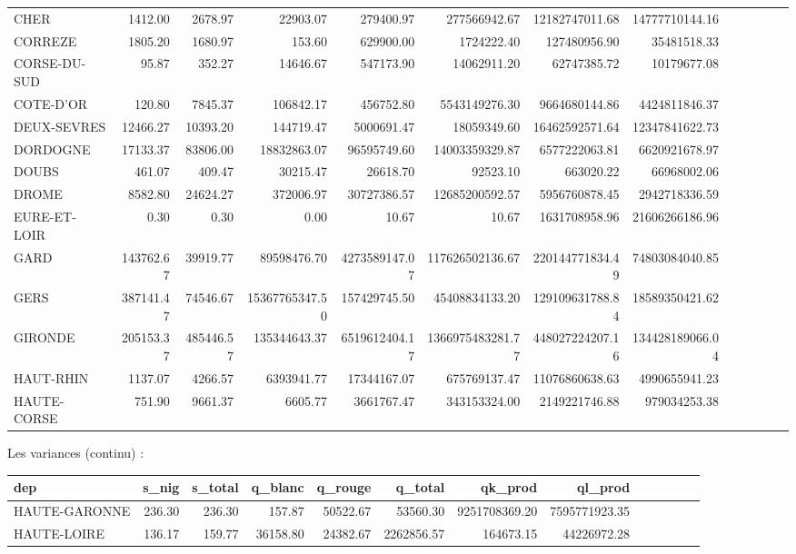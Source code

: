 \documentclass[11pt, a4paper]{article}
\begin{document}
\begin{landscape}
\begin{tabular}{lrrrrrrrrrrrr}
    CHER & 1412.00 & 2678.97 & 22903.07 & 279400.97 & 277566942.67 & 12182747011.68 & 14777710144.16 \\ 
    CORREZE & 1805.20 & 1680.97 & 153.60 & 629900.00 & 1724222.40 & 127480956.90 & 35481518.33 \\ 
    CORSE-DU-SUD & 95.87 & 352.27 & 14646.67 & 547173.90 & 14062911.20 & 62747385.72 & 10179677.08 \\ 
    COTE-D'OR & 120.80 & 7845.37 & 106842.17 & 456752.80 & 5543149276.30 & 9664680144.86 & 4424811846.37 \\ 
    DEUX-SEVRES & 12466.27 & 10393.20 & 144719.47 & 5000691.47 & 18059349.60 & 16462592571.64 & 12347841622.73 \\ 
    DORDOGNE & 17133.37 & 83806.00 & 18832863.07 & 96595749.60 & 14003359329.87 & 6577222063.81 & 6620921678.97 \\ 
    DOUBS & 461.07 & 409.47 & 30215.47 & 26618.70 & 92523.10 & 663020.22 & 66968002.06 \\ 
    DROME & 8582.80 & 24624.27 & 372006.97 & 30727386.57 & 12685200592.57 & 5956760878.45 & 2942718336.59 \\ 
    EURE-ET-LOIR & 0.30 & 0.30 & 0.00 & 10.67 & 10.67 & 1631708958.96 & 21606266186.96 \\ 
    GARD & 143762.67 & 39919.77 & 89598476.70 & 4273589147.07 & 117626502136.67 & 220144771834.49 & 74803084040.85 \\ 
    GERS & 387141.47 & 74546.67 & 15367765347.50 & 157429745.50 & 45408834133.20 & 129109631788.84 & 18589350421.62 \\ 
    GIRONDE & 205153.37 & 485446.57 & 135344643.37 & 6519612404.17 & 1366975483281.77 & 448027224207.16 & 134428189066.04 \\ 
    HAUT-RHIN & 1137.07 & 4266.57 & 6393941.77 & 17344167.07 & 675769137.47 & 11076860638.63 & 4990655941.23 \\ 
    HAUTE-CORSE & 751.90 & 9661.37 & 6605.77 & 3661767.47 & 343153324.00 & 2149221746.88 & 979034253.38 \\ 
    \hline
\end{tabular}
\FloatBarrier
\newpage
Les variances (continu) :
\FloatBarrier
\begin{tabular}{lrrrrrrrrrrrr}
    \hline
    dep & s\_nig & s\_total & q\_blanc & q\_rouge & q\_total & qk\_prod & ql\_prod \\ 
    \hline
    HAUTE-GARONNE & 236.30 & 236.30 & 157.87 & 50522.67 & 53560.30 & 9251708369.20 & 7595771923.35 \\ 
    HAUTE-LOIRE & 136.17 & 159.77 & 36158.80 & 24382.67 & 2262856.57 & 164673.15 & 44226972.28 \\ 

\end{tabular}
\end{landscape}
\end{document}
